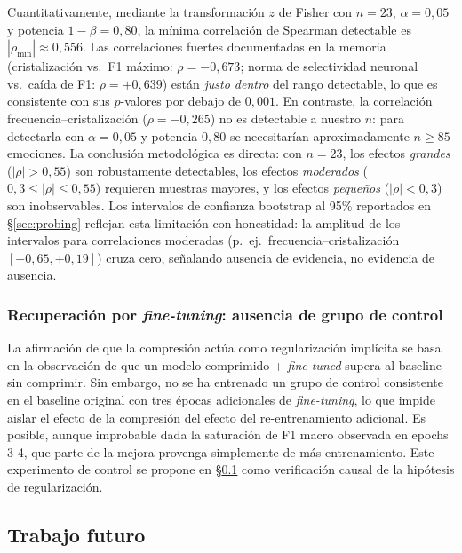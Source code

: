 Cuantitativamente, mediante la transformación $z$ de Fisher con
$n=23$, $\alpha=0{,}05$ y potencia $1-\beta = 0{,}80$, la mínima
correlación de Spearman detectable es
$|\rho_{\min}| \approx 0{,}556$. Las correlaciones fuertes
documentadas en la memoria (cristalización vs.\ F1 máximo:
$\rho = -0{,}673$; norma de selectividad neuronal vs.\ caída de F1:
$\rho = +0{,}639$) están \emph{justo dentro} del rango detectable, lo
que es consistente con sus $p$-valores por debajo de $0{,}001$. En
contraste, la correlación frecuencia--cristalización ($\rho = -0{,}265$)
no es detectable a nuestro $n$: para detectarla con $\alpha=0{,}05$ y
potencia $0{,}80$ se necesitarían aproximadamente $n \geq 85$ emociones.
La conclusión metodológica es directa: con $n=23$, los efectos
\emph{grandes} ($|\rho| > 0{,}55$) son robustamente detectables, los
efectos \emph{moderados} ($0{,}3 \leq |\rho| \leq 0{,}55$) requieren
muestras mayores, y los efectos \emph{pequeños} ($|\rho| < 0{,}3$) son
inobservables. Los intervalos de confianza bootstrap al 95\% reportados
en \S\ref{sec:probing} reflejan esta limitación con honestidad: la
amplitud de los intervalos para correlaciones moderadas
(p.~ej.\ frecuencia--cristalización $[-0{,}65, +0{,}19]$) cruza cero,
señalando ausencia de evidencia, no evidencia de ausencia.

\subsubsection{Recuperación por \emph{fine-tuning}: ausencia de grupo de control}

La afirmación de que la compresión actúa como regularización implícita se
basa en la observación de que un modelo comprimido + \emph{fine-tuned} supera al
baseline sin comprimir. Sin embargo, no se ha entrenado un grupo de control
consistente en el baseline original con tres épocas adicionales de
\emph{fine-tuning}, lo que impide aislar el efecto de la compresión del efecto del
re-entrenamiento adicional. Es posible, aunque improbable dada la
saturación de F1 macro observada en epochs 3-4, que parte de la mejora
provenga simplemente de más entrenamiento. Este experimento de control se
propone en \S\ref{sec:trabajo-futuro} como verificación causal de la
hipótesis de regularización.


\subsection{Trabajo futuro}
\label{sec:trabajo-futuro}

